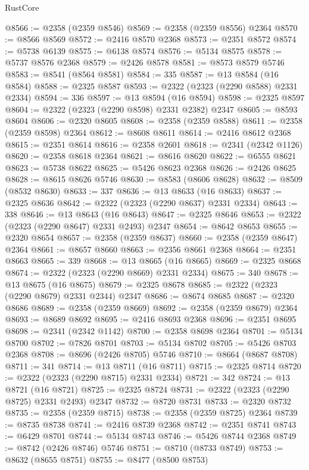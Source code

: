 \begin{lexlean}{RustCore}
\begin{coremodule}
@8566 := @2358 (@2359 @8546)
@8569 := @2358 (@2359 @8556) @2364
@8570 := @8566 @8569
@8572 := @2416 @8570 @2368
@8573 := @2351 @8572
@8574 := @5738 @6139
@8575 := @6138 @8574
@8576 := @5134 @8575
@8578 := @5737 @8576 @2368
@8579 := @2426 @8578
@8581 := @8573 @8579 @5746
@8583 := @8541 (@8564 @8581)
@8584 := 335
@8587 := @13 @8584 (@16 @8584)
@8588 := @2325 @8587
@8593 := @2322 (@2323 (@2290 @8588) @2331 @2334)
@8594 := 336
@8597 := @13 @8594 (@16 @8594)
@8598 := @2325 @8597
@8604 := @2322 (@2323 (@2290 @8598) @2331 @2382) @2347
@8605 := @8593 @8604
@8606 := @2320 @8605
@8608 := @2358 (@2359 @8588)
@8611 := @2358 (@2359 @8598) @2364
@8612 := @8608 @8611
@8614 := @2416 @8612 @2368
@8615 := @2351 @8614
@8616 := @2358 @2601
@8618 := @2341 (@2342 @1126)
@8620 := @2358 @8618 @2364
@8621 := @8616 @8620
@8622 := @6555 @8621
@8623 := @5738 @8622
@8625 := @5426 @8623 @2368
@8626 := @2426 @8625
@8628 := @8615 @8626 @5746
@8630 := @8583 (@8606 @8628)
@8632 := @8509 (@8532 @8630)
@8633 := 337
@8636 := @13 @8633 (@16 @8633)
@8637 := @2325 @8636
@8642 := @2322 (@2323 (@2290 @8637) @2331 @2334)
@8643 := 338
@8646 := @13 @8643 (@16 @8643)
@8647 := @2325 @8646
@8653 := @2322 (@2323 (@2290 @8647) @2331 @2493) @2347
@8654 := @8642 @8653
@8655 := @2320 @8654
@8657 := @2358 (@2359 @8637)
@8660 := @2358 (@2359 @8647) @2364
@8661 := @8657 @8660
@8663 := @2356 @8661 @2368
@8664 := @2351 @8663
@8665 := 339
@8668 := @13 @8665 (@16 @8665)
@8669 := @2325 @8668
@8674 := @2322 (@2323 (@2290 @8669) @2331 @2334)
@8675 := 340
@8678 := @13 @8675 (@16 @8675)
@8679 := @2325 @8678
@8685 := @2322 (@2323 (@2290 @8679) @2331 @2344) @2347
@8686 := @8674 @8685
@8687 := @2320 @8686
@8689 := @2358 (@2359 @8669)
@8692 := @2358 (@2359 @8679) @2364
@8693 := @8689 @8692
@8695 := @2416 @8693 @2368
@8696 := @2351 @8695
@8698 := @2341 (@2342 @1142)
@8700 := @2358 @8698 @2364
@8701 := @5134 @8700
@8702 := @7826 @8701
@8703 := @5134 @8702
@8705 := @5426 @8703 @2368
@8708 := @8696 (@2426 @8705) @5746
@8710 := @8664 (@8687 @8708)
@8711 := 341
@8714 := @13 @8711 (@16 @8711)
@8715 := @2325 @8714
@8720 := @2322 (@2323 (@2290 @8715) @2331 @2334)
@8721 := 342
@8724 := @13 @8721 (@16 @8721)
@8725 := @2325 @8724
@8731 := @2322 (@2323 (@2290 @8725) @2331 @2493) @2347
@8732 := @8720 @8731
@8733 := @2320 @8732
@8735 := @2358 (@2359 @8715)
@8738 := @2358 (@2359 @8725) @2364
@8739 := @8735 @8738
@8741 := @2416 @8739 @2368
@8742 := @2351 @8741
@8743 := @6429 @8701
@8744 := @5134 @8743
@8746 := @5426 @8744 @2368
@8749 := @8742 (@2426 @8746) @5746
@8751 := @8710 (@8733 @8749)
@8753 := @8632 (@8655 @8751)
@8755 := @8477 (@8500 @8753)

\end{coremodule}
\end{lexlean}
